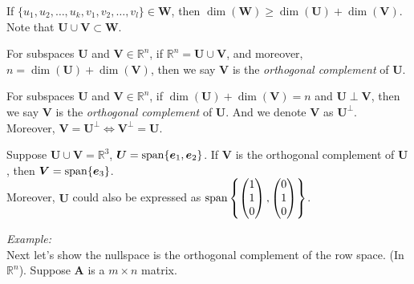 \begin{corollary}
If $\{u_1,u_2,\dots,u_k,v_1,v_2,\dots,v_l\}\in\bm W$, then $\dim(\bm W)\ge\dim(\bm U)+\dim(\bm V)$.\\ Note that $\bm U\cup\bm V\subset\bm W$.
\end{corollary}
For subspaces $\bm U$ and $\bm V\in\mathbb{R}^{n}$, if $\mathbb{R}^{n}=\bm U\cup\bm V$, and moreover, $n=\dim(\bm U)+\dim(\bm V)$, then we say $\bm V$ is the \emph{orthogonal complement} of $\bm U$.
\begin{definition}
For subspaces $\bm U$ and $\bm V\in\mathbb{R}^{n}$, if $\dim(\bm U)+\dim(\bm V)=n$ and $\bm U\perp\bm V$, then we say $\bm V$ is the \emph{orthogonal complement} of $\bm U$. And we denote $\bm V$ as $\bm U^{\perp}$.\\
Moreover, $\bm V=\bm U^{\perp}\Longleftrightarrow\bm V^{\perp}=\bm U$.
\end{definition}
\begin{example}
Suppose $\bm U\cup\bm V=\mathbb{R}^{3}$, $\bm U=\operatorname{span}\{\bm e_1,\bm e_2\}$. If $\bm V$ is the orthogonal complement of $\bm U$, then $\bm V=\operatorname{span}\{\bm e_3\}$. \\Moreover, $\bm U$ could also be expressed as $\operatorname{span}\left\{\begin{pmatrix}
1\\1\\0
\end{pmatrix},\begin{pmatrix}
0\\1\\0
\end{pmatrix}\right\}$.
\end{example}
\emph{Example:}\\
Next let's show the nullspace is the orthogonal complement of the row space. (In $\mathbb{R}^{n}$).
Suppose $\bm A$ is a $m\times n$ matrix.
